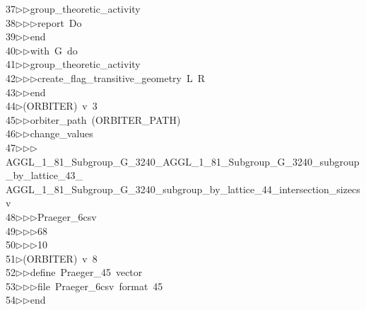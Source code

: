 \begin{tabbing}
37\>$\triangleright$\>$\triangleright$\>group\_theoretic\_activity\ \\[0pt]
38\>$\triangleright$\>$\triangleright$\>$\triangleright$\>report\ Do\ \\[0pt]
39\>$\triangleright$\>$\triangleright$\>end\ \\[0pt]
40\>$\triangleright$\>$\triangleright$\>with\ G\ do\ \\[0pt]
41\>$\triangleright$\>$\triangleright$\>group\_theoretic\_activity\ \\[0pt]
42\>$\triangleright$\>$\triangleright$\>$\triangleright$\>create\_flag\_transitive\_geometry\ L\ R\ \\[0pt]
43\>$\triangleright$\>$\triangleright$\>end\\[0pt]
44\>$\triangleright$\>(ORBITER)\ v\ 3\ \\[0pt]
45\>$\triangleright$\>$\triangleright$\>orbiter\_path\ (ORBITER\_PATH)\ \\[0pt]
46\>$\triangleright$\>$\triangleright$\>change\_values\ \\[0pt]
47\>$\triangleright$\>$\triangleright$\>$\triangleright$\>AGGL\_1\_81\_Subgroup\_G\_3240\_AGGL\_1\_81\_Subgroup\_G\_3240\_subgroup\_by\_lattice\_43\_\\[0pt]
\>AGGL\_1\_81\_Subgroup\_G\_3240\_subgroup\_by\_lattice\_44\_intersection\_sizecsv\ \\[0pt]
48\>$\triangleright$\>$\triangleright$\>$\triangleright$\>Praeger\_6csv\ \\[0pt]
49\>$\triangleright$\>$\triangleright$\>$\triangleright$68\ \\[0pt]
50\>$\triangleright$\>$\triangleright$\>$\triangleright$10\\[0pt]
51\>$\triangleright$\>(ORBITER)\ v\ 8\ \\[0pt]
52\>$\triangleright$\>$\triangleright$\>define\ Praeger\_45\ vector\ \\[0pt]
53\>$\triangleright$\>$\triangleright$\>$\triangleright$\>file\ Praeger\_6csv\ format\ 45\ \\[0pt]
54\>$\triangleright$\>$\triangleright$\>end\ \\[0pt]

\end{tabbing}
